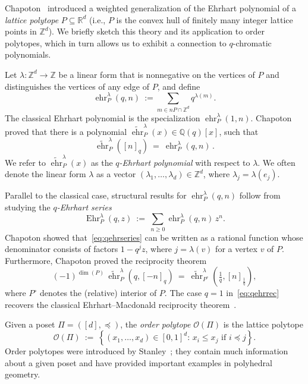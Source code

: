 \documentclass[11pt]{amsart}
\newcommand\ehr{\operatorname{ehr}}
\newcommand\Ehr{\operatorname{Ehr}}
\newcommand\ZZ{\mathbb{Z}}
\newcommand\QQ{\mathbb{Q}}
\newcommand\RR{\mathbb{R}}
\begin{document}
Chapoton~\cite{Chapoton} introduced a weighted generalization of the Ehrhart polynomial of a \emph{lattice polytope} $P\subseteq \RR^d$ (i.e., $P$ is the convex hull of finitely many integer lattice points in $\ZZ^d$). 
We briefly sketch this theory and its application to order polytopes, which in turn allows us to exhibit a connection to $q$-chromatic polynomials.

Let $\lambda:\ZZ^d\to\ZZ$ be a linear form that is nonnegative on the vertices of $P$ and
distinguishes the vertices of any edge of $P$, and define 
\[
\ehr_P^\lambda(q,n) \ := \sum_{m \in nP\cap\ZZ^d} q^{\lambda(m)}.
\]
The classical Ehrhart polynomial \cite{ehrhartpolynomial} is the specialization $\ehr_P^\lambda(1,n)$. 
Chapoton proved that there is a polynomial $\widetilde{\ehr}_P^\lambda(x)\in \QQ(q)[x]$, such that
\begin{equation}\label{eq:chapotonqehr}
\widetilde{\ehr}_P^\lambda([n]_q) \ = \ \ehr_P^\lambda(q,n) \, .
\end{equation}
We refer to $\widetilde{\ehr}_P^\lambda(x)$ as the \textit{$q$-Ehrhart polynomial} with respect to $\lambda$. 
We often denote the linear form $\lambda$ as a vector $(\lambda_1,\hdots,\lambda_d)\in\ZZ^d$, where $\lambda_j=\lambda(e_j)$. 

Parallel to the classical case, structural results for $\ehr_P^\lambda(q,n)$ follow from studying the \emph{$q$-Ehrhart series} 
\begin{equation}\label{eq:qehrseries}
  \Ehr_P^\lambda(q,z) \ := \ \sum_{n\geq0} \ehr_P^\lambda(q,n) \, z^n.
\end{equation}
Chapoton showed that~\eqref{eq:qehrseries} can be written as a rational function whose denominator consists of factors $1 - q^j z$, where $j = \lambda(v)$ for a vertex $v$ of $P$.
Furthermore, Chapoton proved the reciprocity theorem
\begin{equation}\label{eq:qehrrec}
(-1)^{\dim(P)}\, \widetilde{\ehr}^\lambda_P(q,[-n]_{q}) \ = \ \widetilde{\ehr}^\lambda_{P^\circ}\left(\tfrac 1 q, [n]_{\frac 1 q} \right),
\end{equation}
where $P^\circ$ denotes the (relative) interior of $P$.
The case $q=1$ in~\eqref{eq:qehrrec} recovers the classical Ehrhart--Macdonald reciprocity theorem~\cite{macdonald,CRT}.

Given a poset $\Pi=([d],\preceq)$, the \emph{order polytope} $\mathcal{O}(\Pi)$ is the lattice polytope
\[
\mathcal{O}(\Pi) \ := \ \left\{  (x_1,\hdots,x_d)\in[0,1]^d : \, x_i\leq x_j \text{ if }i\preceq j  \right\}.
\]
Order polytopes were introduced by Stanley~\cite{S86}; they contain much information about a given poset and have provided important examples in polyhedral geometry.
\end{document}
